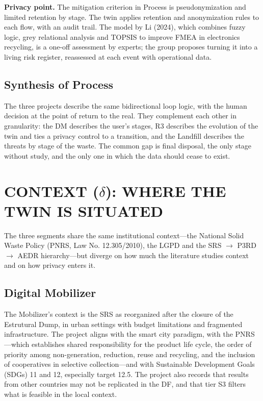 \documentclass[12pt,a4paper,article,oneside,brazil,english]{abntex2}
\begin{document}
\textbf{Privacy point.} The mitigation criterion in Process is pseudonymization and limited retention by stage. The twin applies retention and anonymization rules to each flow, with an audit trail. The model by Li (2024), which combines fuzzy logic, grey relational analysis and TOPSIS to improve FMEA in electronics recycling, is a one-off assessment by experts; the group proposes turning it into a living risk register, reassessed at each event with operational data.

\subsection{Synthesis of Process}

The three projects describe the same bidirectional loop logic, with the human decision at the point of return to the real. They complement each other in granularity: the DM describes the user's stages, R3 describes the evolution of the twin and ties a privacy control to a transition, and the Landfill describes the threats by stage of the waste. The common gap is final disposal, the only stage without study, and the only one in which the data should cease to exist.

\section{CONTEXT (\texorpdfstring{$\delta$}{delta}): WHERE THE TWIN IS SITUATED}

The three segments share the same institutional context---the National Solid Waste Policy (PNRS, Law No. 12.305/2010), the LGPD and the SRS $\rightarrow$ P3RD $\rightarrow$ AEDR hierarchy---but diverge on how much the literature studies context and on how privacy enters it.

\subsection{Digital Mobilizer}

The Mobilizer's context is the SRS as reorganized after the closure of the Estrutural Dump, in urban settings with budget limitations and fragmented infrastructure. The project aligns with the smart city paradigm, with the PNRS---which establishes shared responsibility for the product life cycle, the order of priority among non-generation, reduction, reuse and recycling, and the inclusion of cooperatives in selective collection---and with Sustainable Development Goals (SDGs) 11 and 12, especially target 12.5. The project also records that results from other countries may not be replicated in the DF, and that tier S3 filters what is feasible in the local context.
\end{document}
